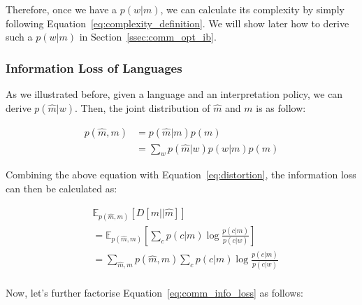 \documentclass[11pt]{article}
\begin{document}
Therefore, once we have a $p(w|m)$, we can calculate its complexity by simply following Equation~\ref{eq:complexity_definition}.
We will show later how to derive such a $p(w|m)$ in Section~\ref{ssec:comm_opt_ib}.

\subsubsection{Information Loss of Languages}
\label{ssec:lan_info_loss}

As we illustrated before, given a language and an interpretation policy, we can derive $p(\hat{m}|w)$.
Then, the joint distribution of $\hat{m}$ and $m$ is as follow:

\begin{equation}
    \begin{split}
        p(\hat{m},m) 
        & = p(\hat{m}|m)p(m) \\
        & = \sum_w p(\hat{m}|w)p(w|m)p(m)
    \end{split}
    \label{eq:joint_c_hat_c}
\end{equation}

Combining the above equation with Equation~\ref{eq:distortion}, the information loss can then be calculated as:

\begin{equation}
    \begin{split}
        & \mathbb{E}_{p(\hat{m},m)}\left[D[m||\hat{m}]\right] \\
        & = \mathbb{E}_{p(\hat{m},m)}\left[ \sum_{c} p(c|m) \log \frac{p(c|m)}{p(c|w)} \right] \\
        & = \sum_{\hat{m},m} p(\hat{m},m) \sum_{c} p(c|m) \log \frac{p(c|m)}{p(c|w)} \\
    \end{split}
    \label{eq:comm_info_loss}
\end{equation}

Now, let's further factorise Equation~\ref{eq:comm_info_loss} as follows:
\end{document}
